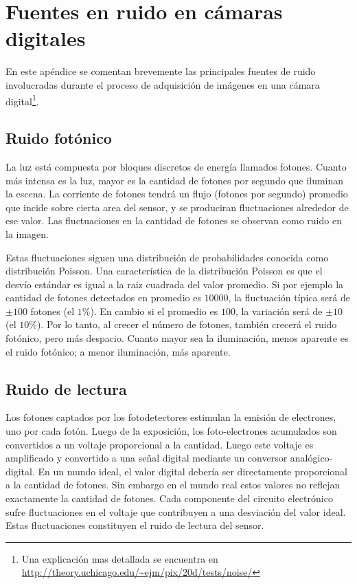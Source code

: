 \chapter{Fuentes en ruido en cámaras digitales}\label{ch:noiseSourcesDigitalCamera}
En este apéndice se comentan brevemente las principales fuentes de ruido involucradas durante el proceso de adquisición de imágenes en una cámara digital\footnote{Una explicación mas detallada se encuentra en \url{http://theory.uchicago.edu/~ejm/pix/20d/tests/noise/}}.

\section{Ruido fotónico}
La luz está compuesta por bloques discretos de energía llamados fotones. Cuanto más intensa es la luz, mayor es la cantidad de fotones por segundo que iluminan la escena. La corriente de fotones tendrá un flujo (fotones por segundo) promedio que incide sobre cierta area del sensor, y se produciran fluctuaciones alrededor de ese valor. Las fluctuaciones en la cantidad de fotones se observan como ruido en la imagen. 

Estas fluctuaciones siguen una distribución de probabilidades conocida como distribución Poisson. Una característica de la distribución Poisson es que el desvío estándar es igual a la raiz cuadrada del valor promedio. Si por ejemplo la cantidad de fotones detectados en promedio es $10000$, la fluctuación típica será de $\pm100$ fotones (el $1\%$). En cambio si el promedio es $100$, la variación será de $\pm10$ (el $10\%$). Por lo tanto, al crecer el número de fotones, también crecerá el ruido fotónico, pero más despacio. Cuanto mayor sea la iluminación, menos aparente es el ruido fotónico; a menor iluminación, más aparente.

\section{Ruido de lectura}
Los fotones captados por los fotodetectores estimulan la emisión de electrones, uno por cada fotón. Luego de la exposición, los foto-electrones acumulados son convertidos a un voltaje proporcional a la cantidad. Luego este voltaje es amplificado y convertido a una señal digital mediante un conversor analógico-digital. En un mundo ideal, el valor digital debería ser directamente proporcional a la cantidad de fotones. Sin embargo en el mundo real  estos valores no reflejan exactamente la cantidad de fotones. Cada componente del circuito electrónico sufre fluctuaciones en el voltaje que contribuyen a una desviación del valor ideal. Estas fluctuaciones constituyen el ruido de lectura del sensor.


